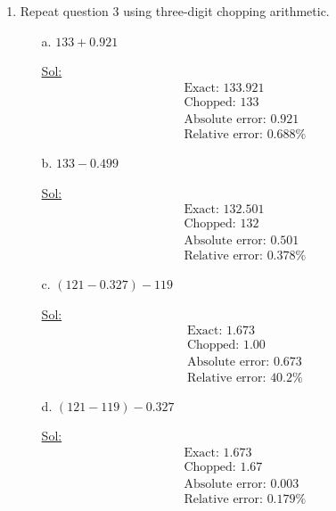 \begin{enumerate}
\item Repeat question 3 using three-digit chopping arithmetic.
  \begin{itemize}
    \item[a.] \( 133 + 0.921 \)

      \underline{Sol:}\\
      \[
        \begin{array}{l}
          \textrm{Exact: } 133.921 \\
          \textrm{Chopped: } 133 \\
          \textrm{Absolute error: } 0.921 \\
          \textrm{Relative error: } 0.688\%
        \end{array}
      \]
      \bigbreak

    \item[b.] \( 133 - 0.499 \)

      \underline{Sol:}\\
      \[
        \begin{array}{l}
          \textrm{Exact: } 132.501 \\
          \textrm{Chopped: } 132 \\
          \textrm{Absolute error: } 0.501 \\
          \textrm{Relative error: } 0.378\%
        \end{array}
      \]
      \bigbreak

    \item[c.] \( (121 - 0.327) - 119 \)

      \underline{Sol:}\\
      \[
        \begin{array}{l}
          \textrm{Exact: } 1.673 \\
          \textrm{Chopped: } 1.00 \\
          \textrm{Absolute error: } 0.673 \\
          \textrm{Relative error: } 40.2\%
        \end{array}
      \]
      \bigbreak

    \item[d.] \( (121 - 119) - 0.327 \)

      \underline{Sol:}\\
      \[
        \begin{array}{l}
          \textrm{Exact: } 1.673 \\
          \textrm{Chopped: } 1.67 \\
          \textrm{Absolute error: } 0.003 \\
          \textrm{Relative error: } 0.179\%
        \end{array}
      \]
      \bigbreak


\end{itemize}
\end{enumerate}
